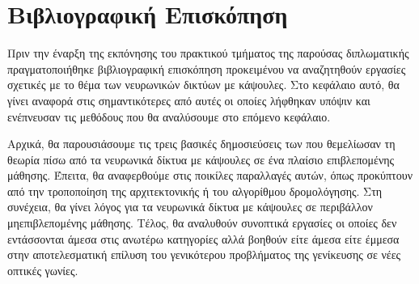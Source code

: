 \chapter{Βιβλιογραφική Επισκόπηση}
\label{chap:related_work}

Πριν την έναρξη της εκπόνησης του πρακτικού τμήματος της παρούσας διπλωματικής πραγματοποιήθηκε βιβλιογραφική επισκόπηση προκειμένου να αναζητηθούν εργασίες σχετικές με το θέμα των νευρωνικών δικτύων με κάψουλες. Στο κεφάλαιο αυτό, θα γίνει αναφορά στις σημαντικότερες από αυτές οι οποίες λήφθηκαν υπόψιν και ενέπνευσαν τις μεθόδους που θα αναλύσουμε στο επόμενο κεφάλαιο. \par

Αρχικά, θα παρουσιάσουμε τις τρεις βασικές δημοσιεύσεις των  \cite{hinton2011transforming, sabour2017dynamic, hinton2018matrix} που θεμελίωσαν τη θεωρία πίσω από τα νευρωνικά δίκτυα με κάψουλες σε ένα πλαίσιο επιβλεπομένης μάθησης. Έπειτα, θα αναφερθούμε στις ποικίλες παραλλαγές αυτών, όπως προκύπτουν από την τροποποίηση της αρχιτεκτονικής ή του αλγορίθμου δρομολόγησης. Στη συνέχεια, θα γίνει λόγος για τα νευρωνικά δίκτυα με κάψουλες σε περιβάλλον μη\textendash επιβλεπομένης μάθησης. Τέλος, θα αναλυθούν συνοπτικά εργασίες οι οποίες δεν εντάσσονται άμεσα στις ανωτέρω κατηγορίες αλλά βοηθούν είτε άμεσα είτε έμμεσα στην αποτελεσματική επίλυση του γενικότερου προβλήματος της γενίκευσης σε νέες οπτικές γωνίες.\par

